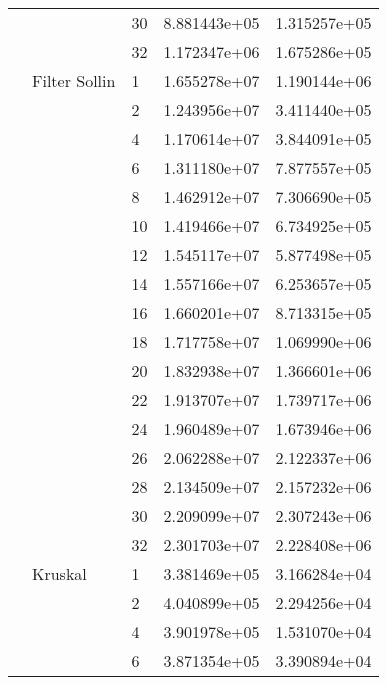 \begin{tabular}{lllrr}
                      &            & 30 &  8.881443e+05 &  1.315257e+05 \\
                      &            & 32 &  1.172347e+06 &  1.675286e+05 \\
                      & Filter Sollin & 1  &  1.655278e+07 &  1.190144e+06 \\
                      &            & 2  &  1.243956e+07 &  3.411440e+05 \\
                      &            & 4  &  1.170614e+07 &  3.844091e+05 \\
                      &            & 6  &  1.311180e+07 &  7.877557e+05 \\
                      &            & 8  &  1.462912e+07 &  7.306690e+05 \\
                      &            & 10 &  1.419466e+07 &  6.734925e+05 \\
                      &            & 12 &  1.545117e+07 &  5.877498e+05 \\
                      &            & 14 &  1.557166e+07 &  6.253657e+05 \\
                      &            & 16 &  1.660201e+07 &  8.713315e+05 \\
                      &            & 18 &  1.717758e+07 &  1.069990e+06 \\
                      &            & 20 &  1.832938e+07 &  1.366601e+06 \\
                      &            & 22 &  1.913707e+07 &  1.739717e+06 \\
                      &            & 24 &  1.960489e+07 &  1.673946e+06 \\
                      &            & 26 &  2.062288e+07 &  2.122337e+06 \\
                      &            & 28 &  2.134509e+07 &  2.157232e+06 \\
                      &            & 30 &  2.209099e+07 &  2.307243e+06 \\
                      &            & 32 &  2.301703e+07 &  2.228408e+06 \\
                      & Kruskal & 1  &  3.381469e+05 &  3.166284e+04 \\
                      &            & 2  &  4.040899e+05 &  2.294256e+04 \\
                      &            & 4  &  3.901978e+05 &  1.531070e+04 \\
                      &            & 6  &  3.871354e+05 &  3.390894e+04 \\

\end{tabular}
